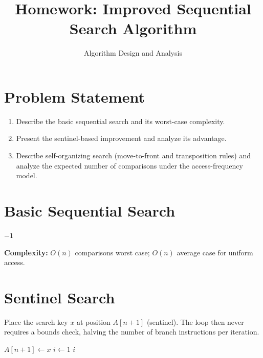 \documentclass[12pt]{article}
\title{Homework: Improved Sequential Search Algorithm}
\author{Algorithm Design and Analysis}
\date{}
\begin{document}
\maketitle

\section{Problem Statement}

\begin{enumerate}
  \item Describe the basic sequential search and its worst-case complexity.
  \item Present the sentinel-based improvement and analyze its advantage.
  \item Describe self-organizing search (move-to-front and transposition rules) and
        analyze the expected number of comparisons under the access-frequency model.
\end{enumerate}

\section{Basic Sequential Search}

\begin{algorithm}[H]
\SetAlgoLined
{}
\Return $-1$\;
\caption{Basic Sequential Search}
\end{algorithm}

\textbf{Complexity:} $O(n)$ comparisons worst case; $O(n)$ average case for uniform access.

\section{Sentinel Search}

Place the search key $x$ at position $A[n+1]$ (sentinel). The loop then never requires
a bounds check, halving the number of branch instructions per iteration.

\begin{algorithm}[H]
\SetAlgoLined
{}
$A[n+1] \leftarrow x$\;
$i \leftarrow 1$\;
\Return $i$\;
\caption{Sentinel Sequential Search}
\end{algorithm}
\end{document}
